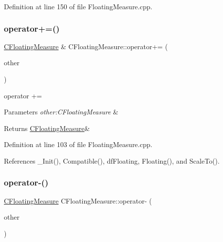 Definition at line 150 of file Floating\+Measure.\+cpp.

\mbox{\label{classCFloatingMeasure_a40f0ec4cb155856efed8db28c7c8fa3e}} 
\subsubsection{\texorpdfstring{operator+=()}{operator+=()}}
{\footnotesize\ttfamily \hyperlink{classCFloatingMeasure}{C\+Floating\+Measure} \& C\+Floating\+Measure\+::operator+= (\begin{DoxyParamCaption}\item[{const \hyperlink{classCFloatingMeasure}{C\+Floating\+Measure} \&}]{other }\end{DoxyParamCaption})}



operator += 


\begin{DoxyParams}{Parameters}
{\em other\+:\+C\+Floating\+Measure} & \\
\hline
\end{DoxyParams}
\begin{DoxyReturn}{Returns}
\hyperlink{classCFloatingMeasure}{C\+Floating\+Measure}\& 
\end{DoxyReturn}


Definition at line 103 of file Floating\+Measure.\+cpp.



References \+\_\+\+Init(), Compatible(), df\+Floating, Floating(), and Scale\+To().

\mbox{\label{classCFloatingMeasure_ad29973f56a38dda22fc9d66a16b13860}} 
\subsubsection{\texorpdfstring{operator-\/()}{operator-()}}
{\footnotesize\ttfamily \hyperlink{classCFloatingMeasure}{C\+Floating\+Measure} C\+Floating\+Measure\+::operator-\/ (\begin{DoxyParamCaption}\item[{const \hyperlink{classCFloatingMeasure}{C\+Floating\+Measure} \&}]{other }\end{DoxyParamCaption})}



